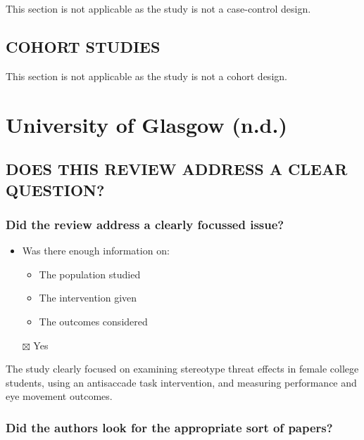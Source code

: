 \documentclass[
  doc, a4paper]{apa7}
\providecommand{\tightlist}{%
  \setlength{\itemsep}{0pt}\setlength{\parskip}{0pt}}
\begin{document}
This section is not applicable as the study is not a case-control design.

\subsection{\texorpdfstring{\textbf{COHORT STUDIES}}{COHORT STUDIES}}\label{cohort-studies}

This section is not applicable as the study is not a cohort design.

\section{University of Glasgow (n.d.)}\label{universityofglasgowcriticalappraisalchecklistn.d.nodate}

\subsection{DOES THIS REVIEW ADDRESS A CLEAR QUESTION?}\label{does-this-review-address-a-clear-question}

\subsubsection{Did the review address a clearly focussed issue?}\label{did-the-review-address-a-clearly-focussed-issue}

\begin{itemize}
\tightlist
\item
  Was there enough information on:

  \begin{itemize}
  \tightlist
  \item
    The population studied
  \item
    The intervention given
  \item
    The outcomes considered
  \end{itemize}
\item[$\boxtimes$]
  Yes
\end{itemize}

The study clearly focused on examining stereotype threat effects in female college students, using an antisaccade task intervention, and measuring performance and eye movement outcomes.

\subsubsection{Did the authors look for the appropriate sort of papers?}\label{did-the-authors-look-for-the-appropriate-sort-of-papers}
\end{document}
